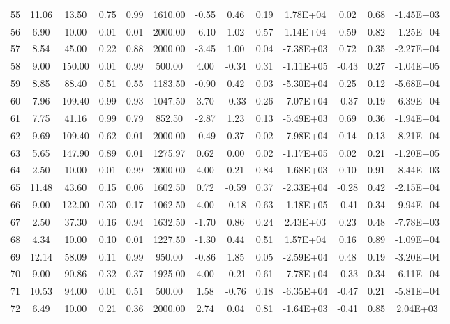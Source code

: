 \begin{landscape}
\begin{center}
\begin{longtable}{|c|c|c|c|c|c|c|c|c|c|c|c|c|}
55 & 11.06 & 13.50  & 0.75 & 0.99 & 1610.00 & -0.55 & 0.46  & 0.19 & 1.78E+04  & 0.02  & 0.68 & -1.45E+03 \\
56 & 6.90  & 10.00  & 0.01 & 0.01 & 2000.00 & -6.10 & 1.02  & 0.57 & 1.14E+04  & 0.59  & 0.82 & -1.25E+04 \\
57 & 8.54  & 45.00  & 0.22 & 0.88 & 2000.00 & -3.45 & 1.00  & 0.04 & -7.38E+03 & 0.72  & 0.35 & -2.27E+04 \\
58 & 9.00  & 150.00 & 0.01 & 0.99 & 500.00  & 4.00  & -0.34 & 0.31 & -1.11E+05 & -0.43 & 0.27 & -1.04E+05 \\
59 & 8.85  & 88.40  & 0.51 & 0.55 & 1183.50 & -0.90 & 0.42  & 0.03 & -5.30E+04 & 0.25  & 0.12 & -5.68E+04 \\
60 & 7.96  & 109.40 & 0.99 & 0.93 & 1047.50 & 3.70  & -0.33 & 0.26 & -7.07E+04 & -0.37 & 0.19 & -6.39E+04 \\
61 & 7.75  & 41.16  & 0.99 & 0.79 & 852.50  & -2.87 & 1.23  & 0.13 & -5.49E+03 & 0.69  & 0.36 & -1.94E+04 \\
62 & 9.69  & 109.40 & 0.62 & 0.01 & 2000.00 & -0.49 & 0.37  & 0.02 & -7.98E+04 & 0.14  & 0.13 & -8.21E+04 \\
63 & 5.65  & 147.90 & 0.89 & 0.01 & 1275.97 & 0.62  & 0.00  & 0.02 & -1.17E+05 & 0.02  & 0.21 & -1.20E+05 \\
64 & 2.50  & 10.00  & 0.01 & 0.99 & 2000.00 & 4.00  & 0.21  & 0.84 & -1.68E+03 & 0.10  & 0.91 & -8.44E+03 \\
65 & 11.48 & 43.60  & 0.15 & 0.06 & 1602.50 & 0.72  & -0.59 & 0.37 & -2.33E+04 & -0.28 & 0.42 & -2.15E+04 \\
66 & 9.00  & 122.00 & 0.30 & 0.17 & 1062.50 & 4.00  & -0.18 & 0.63 & -1.18E+05 & -0.41 & 0.34 & -9.94E+04 \\
67 & 2.50  & 37.30  & 0.16 & 0.94 & 1632.50 & -1.70 & 0.86  & 0.24 & 2.43E+03  & 0.23  & 0.48 & -7.78E+03 \\
68 & 4.34  & 10.00  & 0.10 & 0.01 & 1227.50 & -1.30 & 0.44  & 0.51 & 1.57E+04  & 0.16  & 0.89 & -1.09E+04 \\
69 & 12.14 & 58.09  & 0.11 & 0.99 & 950.00  & -0.86 & 1.85  & 0.05 & -2.59E+04 & 0.48  & 0.19 & -3.20E+04 \\
70 & 9.00  & 90.86  & 0.32 & 0.37 & 1925.00 & 4.00  & -0.21 & 0.61 & -7.78E+04 & -0.33 & 0.34 & -6.11E+04 \\
71 & 10.53 & 94.00  & 0.01 & 0.51 & 500.00  & 1.58  & -0.76 & 0.18 & -6.35E+04 & -0.47 & 0.21 & -5.81E+04 \\
72 & 6.49  & 10.00  & 0.21 & 0.36 & 2000.00 & 2.74  & 0.04  & 0.81 & -1.64E+03 & -0.41 & 0.85 & 2.04E+03  \\

\end{longtable}
\end{center}
\end{landscape}
